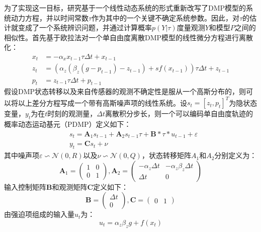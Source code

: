 为了实现这一目标，研究基于一个线性动态系统的形式重新改写了DMP模型的系统动力方程，并以时间常数$τ$作为其中的一个关键不确定系统参数。因此，对$τ$的估计就变成了一个系统辨识问题，并通过计算概率$p(Y|τ)$度量观测$Y$和模型$P$之间的相似性。首先基于欧拉法对一个单自由度离散DMP模型的线性微分方程进行离散化：
\begin{equation}
    \begin{aligned}
    x_t & =-\alpha_x x_{t-1} \tau \Delta t+x_{t-1} \\
    z_t & =\left(\alpha_z\left(\beta_z\left(g-p_{t-1}\right)-z_{t-1}\right)+s f\left(x_{t-1}\right)\right) \tau \Delta t+z_{t-1} \\
    p_t & =z_{t-1} \tau \Delta t+p_{t-1}
    \end{aligned}
    \label{eq:4-11}
\end{equation}
假设DMP状态转移以及来自传感器的观测不确定性是服从一个高斯分布的，则可以将以上差分方程写成一个带有高斯噪声项的线性系统。设$s_t = [z_t,p_t]^T$为隐状态变量，$y_t$为在$t$时刻的观测量，$\Delta t$离散积分步长，则一个可以编码单自由度轨迹的概率动态运动基元（PDMP）定义如下：
\begin{equation}
    \begin{aligned}
    & s_t=\mathbf{A}_1 s_{t-1}+\mathbf{A}_2 s_{t-1} \tau+\mathbf{B} * \tau * u_{t-1}+\varepsilon \\
    & y_t=\mathbf{C} s_t+\nu
    \end{aligned}
    \label{eq:4-12}
\end{equation}
其中噪声项$\varepsilon \backsim \mathcal N(0,R)$以及$\nu \backsim \mathcal N(0,Q)$，状态转移矩阵$A_1$和$A_2$分别定义为：
\begin{equation}
    \mathbf{A}_1=\left(\begin{array}{ll}
    1 & 0 \\
    0 & 1
    \end{array}\right), \mathbf{A}_2=\left(\begin{array}{cc}
    -\alpha_z \Delta t & -\alpha_z \beta_z \Delta t \\
    \Delta t & 0
    \end{array}\right)
    \label{eq:4-13}
\end{equation}
输入控制矩阵$\mathbf{B}$和观测矩阵$\mathbf{C}$定义如下：
\begin{equation}
    \mathbf{B}=\left(\begin{array}{c}
    \Delta t \\
    0
    \end{array}\right), \mathbf{C}=\left(\begin{array}{ll}
    0 & 1
    \end{array}\right)
    \label{eq:4-14}
\end{equation}
由强迫项组成的输入量$u_t$为：
\begin{equation}
    u_t=\alpha_z \beta_z g+ f\left(x_t\right)
    \label{eq:4-15}
\end{equation}

